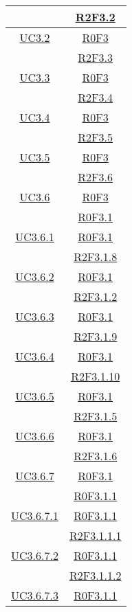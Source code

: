 \begin{longtable}{|c|c|}
& \hyperlink{R2F3.2}{R2F3.2}\\
\hline
\hyperlink{UC3.2}{UC3.2} & \hyperlink{R0F3}{R0F3}\\
& \hyperlink{R2F3.3}{R2F3.3}\\
\hline
\hyperlink{UC3.3}{UC3.3} & \hyperlink{R0F3}{R0F3}\\
& \hyperlink{R2F3.4}{R2F3.4}\\
\hline
\hyperlink{UC3.4}{UC3.4} & \hyperlink{R0F3}{R0F3}\\
& \hyperlink{R2F3.5}{R2F3.5}\\
\hline
\hyperlink{UC3.5}{UC3.5} & \hyperlink{R0F3}{R0F3}\\
& \hyperlink{R2F3.6}{R2F3.6}\\
\hline
\hyperlink{UC3.6}{UC3.6} & \hyperlink{R0F3}{R0F3}\\
& \hyperlink{R0F3.1}{R0F3.1}\\
\hline
\hyperlink{UC3.6.1}{UC3.6.1} & \hyperlink{R0F3.1}{R0F3.1}\\
& \hyperlink{R2F3.1.8}{R2F3.1.8}\\
\hline
\hyperlink{UC3.6.2}{UC3.6.2} & \hyperlink{R0F3.1}{R0F3.1}\\
& \hyperlink{R2F3.1.2}{R2F3.1.2}\\
\hline
\hyperlink{UC3.6.3}{UC3.6.3} & \hyperlink{R0F3.1}{R0F3.1}\\
& \hyperlink{R2F3.1.9}{R2F3.1.9}\\
\hline
\hyperlink{UC3.6.4}{UC3.6.4} & \hyperlink{R0F3.1}{R0F3.1}\\
& \hyperlink{R2F3.1.10}{R2F3.1.10}\\
\hline
\hyperlink{UC3.6.5}{UC3.6.5} & \hyperlink{R0F3.1}{R0F3.1}\\
& \hyperlink{R2F3.1.5}{R2F3.1.5}\\
\hline
\hyperlink{UC3.6.6}{UC3.6.6} & \hyperlink{R0F3.1}{R0F3.1}\\
& \hyperlink{R2F3.1.6}{R2F3.1.6}\\
\hline
\hyperlink{UC3.6.7}{UC3.6.7} & \hyperlink{R0F3.1}{R0F3.1}\\
& \hyperlink{R0F3.1.1}{R0F3.1.1}\\
\hline
\hyperlink{UC3.6.7.1}{UC3.6.7.1} & \hyperlink{R0F3.1.1}{R0F3.1.1}\\
& \hyperlink{R2F3.1.1.1}{R2F3.1.1.1}\\
\hline
\hyperlink{UC3.6.7.2}{UC3.6.7.2} & \hyperlink{R0F3.1.1}{R0F3.1.1}\\
& \hyperlink{R2F3.1.1.2}{R2F3.1.1.2}\\
\hline
\hyperlink{UC3.6.7.3}{UC3.6.7.3} & \hyperlink{R0F3.1.1}{R0F3.1.1}\\

\end{longtable}
